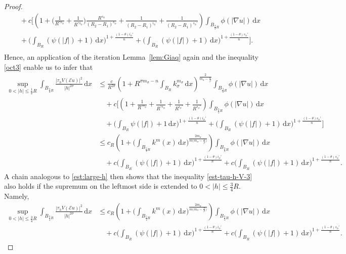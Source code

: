 \documentclass[leqno,11pt]{amsart}%
\numberwithin{equation}{section}
\def\d{\mathrm{d}}
\def\E{\mathcal{E}}
\def\dx{\d x}
\theoremstyle{definition}
\numberwithin{equation}{section}
\begin{document}
\begin{proof}
\begin{align}
    &\quad
      +
      c 
      \Bigg[\left(1+\Big({\frac{1}{R^{\gamma s_\phi}}+\frac{1}{R^{\gamma i_\phi}}}\Big)\frac{R^{s_\phi}}{(R_2-R_1)^{s_\phi}}
      +
      \frac{1}{(R_2-R_1)^{i_\phi'}}
      +
      {
      \frac{1}{(R_2-R_1)^{s_\phi'}}
      }\right)
       \int_{B_{\frac{3}{2}R}} \phi(|\nabla u|)\,\dx
       \\ \nonumber & \quad+ \bigg(\int_{B_{R}}(\psi(|f|)+1)\,\dx\bigg)^{1+\frac{({1-\theta}) i_\phi'}{n}}
       +
       {
       \bigg(\int_{B_{R}}(\psi(|f|)+1)\,\dx\bigg)^{1+\frac{({1-\theta}) s_\phi'}{n}}
       }\Bigg].\\\nonumber
  \end{align}
 Hence, an application of the iteration Lemma~\ref{lem:Giaq} again and the  inequality \eqref{oct3} enable us to infer that
  \begin{align}\label{est-tau-h-V-3}
    \sup_{0<|h|\leq  {\frac{1}{2}R}}\int_{B_{ {\frac 34R}}}\frac{|\tau_hV(\E u)|^2}{|h|^{2\sigma}}\,\dx
    &\le \frac{c }{R^{ {2\sigma}}}\left(1+ {R^{\sigma {m_\sigma}-n}}\int_{B_{ {R}}}k_\sigma^{{m_\sigma}}\,\dx\right)^{{\frac{2}{{m_\sigma}-\frac{n}{\beta}}}} \int_{B_{\frac{3}{2}R}}\phi(|\nabla u|)\,\dx\\\nonumber 
      &\quad+
  c
    \Bigg[\left({1+}{\frac{1}{R^{\gamma s_\phi}}+\frac{1}{R^{\gamma i_\phi}}}+\frac{1}{R^{i_\phi'}}+
    \frac{1}{R^{s_\phi'}}
    \right)\int_{B_{\frac{3}{2}R}}\phi(|\nabla u|)\,\dx
    \\\nonumber
    &\quad+{\bigg(\int_{B_R}\psi(|f|)+1\,\dx\bigg)^{1+\frac{({1-\theta}) i_\phi'}{n}}
    +
    \bigg(\int_{B_{R}}(\psi(|f|)+1)\,\dx\bigg)^{1+\frac{({1-\theta}) s_\phi'}{n}}
       }\Bigg] \nonumber
       \\  \nonumber & \le {c_R}
    \left(1+
       \bigg(\int_{B_{ \frac 54 R}}k^{{m}}(x)\,\dx\bigg)^{{\frac{2m_\sigma}{{m(m_\sigma}-\frac{n}{\beta})}}}  \right)  \int_{B_{\frac{3}{2}R}}\phi(|\nabla u|)\,\dx\\\nonumber 
      &\quad+
   c
{\bigg(\int_{B_R}(\psi(|f|)+1)\,\dx\bigg)^{1+\frac{({1-\theta}) i_\phi'}{n}}
+c\bigg(\int_{B_{R}}(\psi(|f|)+1)\,\dx\bigg)^{1+\frac{({1-\theta}) s_\phi'}{n}}
       }.
  \end{align}
  A chain analogous to \eqref{est:large-h} then shows that the inequality \eqref{est-tau-h-V-3} also holds if the supremum on the leftmost side is extended to $0<|h|\leq \frac 34R$. Namely,
  \begin{align}\label{est-tau-h-V-4}
    \sup_{0<|h|\leq \frac 34R}\int_{B_{ {\frac 34R}}}\frac{|\tau_hV(\E u)|^2}{|h|^{2\sigma}}\,\dx
     & \le {c_R}
    \left(1+
       \bigg(\int_{B_{ {{\frac 54 R}}}}k^{{m}}(x)\,\dx\bigg)^{{\frac{2m_\sigma}{{m(m_\sigma}-\frac{n}{\beta})}}}  \right)  \int_{B_{\frac{3}{2}R}}\phi(|\nabla u|)\,\dx\\\nonumber 
      &\quad+
   c
{\bigg(\int_{B_R}(\psi(|f|)+1)\,\dx\bigg)^{1+\frac{({1-\theta}) i_\phi'}{n}}
+c\bigg(\int_{B_{R}}(\psi(|f|)+1)\,\dx\bigg)^{1+\frac{({1-\theta}) s_\phi'}{n}}
       }.
  \end{align}
  \end{proof}
 
\end{document}
